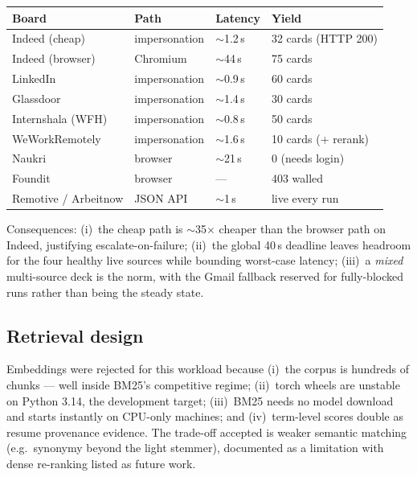 \documentclass[11pt,a4paper]{article}
\begin{document}
\begin{center}
\begin{tabular}{@{}llll@{}}
\toprule
\textbf{Board} & \textbf{Path} & \textbf{Latency} & \textbf{Yield}\\
\midrule
Indeed (cheap)      & impersonation & $\sim$1.2\,s & 32 cards (HTTP 200)\\
Indeed (browser)    & Chromium      & $\sim$44\,s  & 75 cards\\
LinkedIn            & impersonation & $\sim$0.9\,s & 60 cards\\
Glassdoor           & impersonation & $\sim$1.4\,s & 30 cards\\
Internshala (WFH)   & impersonation & $\sim$0.8\,s & 50 cards\\
WeWorkRemotely      & impersonation & $\sim$1.6\,s & 10 cards (+ rerank)\\
Naukri              & browser       & $\sim$21\,s  & 0 (needs login)\\
Foundit             & browser       & ---         & 403 walled\\
Remotive / Arbeitnow & JSON API     & $\sim$1\,s   & live every run\\
\bottomrule
\end{tabular}
\end{center}

Consequences: (i)~the cheap path is $\sim$35$\times$ cheaper than the
browser path on Indeed, justifying escalate-on-failure; (ii)~the global
40\,s deadline leaves headroom for the four healthy live sources while
bounding worst-case latency; (iii)~a \emph{mixed} multi-source deck is the
norm, with the Gmail fallback reserved for fully-blocked runs rather than
being the steady state.

\subsection{Retrieval design}
\label{sec:eval-rag}

Embeddings were rejected for this workload because (i)~the corpus is
hundreds of chunks --- well inside BM25's competitive regime;
(ii)~torch wheels are unstable on Python 3.14, the development target;
(iii)~BM25 needs no model download and starts instantly on CPU-only
machines; and (iv)~term-level scores double as resume provenance evidence.
The trade-off accepted is weaker semantic matching (e.g.\ synonymy beyond
the light stemmer), documented as a limitation with dense re-ranking listed
as future work.
\end{document}

